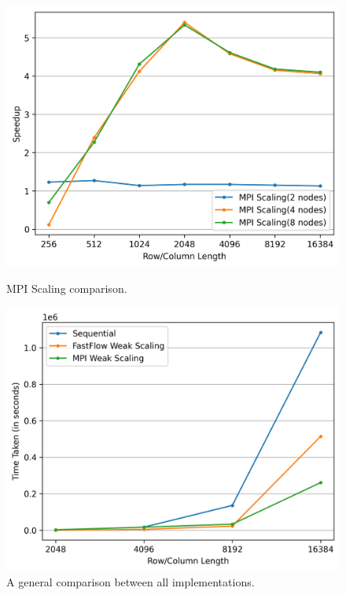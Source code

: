 \begin{figure}[h!]
    \begin{minipage}[t]{0.49\textwidth}
        \centering
        \includegraphics[width=\textwidth]{img/MPI/mpi_scaling.png}
        \caption{MPI Scaling comparison.}
        \label{MPI_Scaling}
    \end{minipage}
    \hfill
    \begin{minipage}[t]{0.49\textwidth}
        \centering
        \includegraphics[width=\textwidth]{img/MPI/all_comparison.png}
        \caption{A general comparison between all implementations.}
        \label{ALL}
    \end{minipage}
\end{figure}


